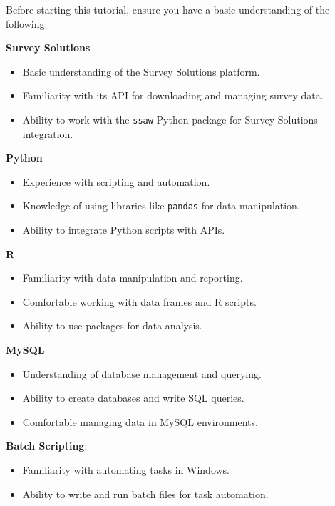 \documentclass[
  letterpaper,
  DIV=11,
  numbers=noendperiod]{scrreprt}
\providecommand{\tightlist}{%
  \setlength{\itemsep}{0pt}\setlength{\parskip}{0pt}}\usepackage{longtable,booktabs,array}
\begin{document}

Before starting this tutorial, ensure you have a basic understanding of
the following:

\textbf{Survey Solutions}

\begin{itemize}
\tightlist
\item
  Basic understanding of the Survey Solutions platform.
\item
  Familiarity with its API for downloading and managing survey data.
\item
  Ability to work with the \texttt{ssaw} Python package for Survey
  Solutions integration.
\end{itemize}

\textbf{Python}

\begin{itemize}
\item
  Experience with scripting and automation.
\item
  Knowledge of using libraries like \texttt{pandas} for data
  manipulation.
\item
  Ability to integrate Python scripts with APIs.
\end{itemize}

\textbf{R}

\begin{itemize}
\item
  Familiarity with data manipulation and reporting.
\item
  Comfortable working with data frames and R scripts.
\item
  Ability to use packages for data analysis.
\end{itemize}

\textbf{MySQL}

\begin{itemize}
\item
  Understanding of database management and querying.
\item
  Ability to create databases and write SQL queries.
\item
  Comfortable managing data in MySQL environments.
\end{itemize}

\textbf{Batch Scripting}:

\begin{itemize}
\item
  Familiarity with automating tasks in Windows.
\item
  Ability to write and run batch files for task automation.
\end{itemize}
\end{document}
